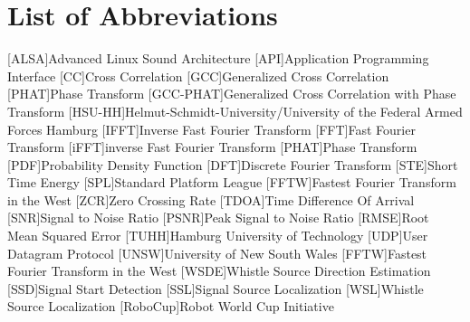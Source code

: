 \chapter*{List of Abbreviations}
\label{sec:abbreviations}

\begin{acronym}[HSU-HH]
  [ALSA]{Advanced Linux Sound Architecture}
  [API]{Application Programming Interface}
  [CC]{Cross Correlation}
  [GCC]{Generalized Cross Correlation}
  [PHAT]{Phase Transform}
  [GCC-PHAT]{Generalized Cross Correlation with Phase Transform}
  [HSU-HH]{Helmut-Schmidt-University/University of the Federal Armed Forces Hamburg}
  [IFFT]{Inverse Fast Fourier Transform}
  [FFT]{Fast Fourier Transform}
  [iFFT]{inverse Fast Fourier Transform}
  [PHAT]{Phase Transform}
  [PDF]{Probability Density Function}
  [DFT]{Discrete Fourier Transform}
  [STE]{Short Time Energy}
  [SPL]{Standard Platform League}
  [FFTW]{Fastest Fourier Transform in the West}
  [ZCR]{Zero Crossing Rate}
  [TDOA]{Time Difference Of Arrival}
  [SNR]{Signal to Noise Ratio}
  [PSNR]{Peak Signal to Noise Ratio}
  [RMSE]{Root Mean Squared Error}
  [TUHH]{Hamburg University of Technology}
  [UDP]{User Datagram Protocol}
  [UNSW]{University of New South Wales}
  [FFTW]{Fastest Fourier Transform in the West}
  [WSDE]{Whistle Source Direction Estimation}
  [SSD]{Signal Start Detection}
  [SSL]{Signal Source Localization}
  [WSL]{Whistle Source Localization}
  [RoboCup]{Robot World Cup Initiative}
\end{acronym}
